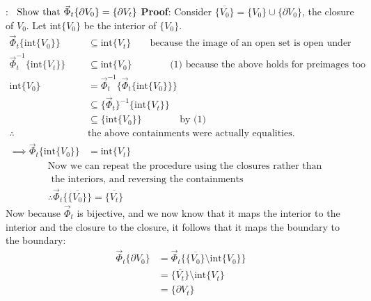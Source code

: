 \documentclass[a4paper,12pt]{article}
\begin{document}
\textbf{\citep[Problem 2.2.2.]{o81}}:$\;\;\; \text{Show that }\vec{\Phi}_t\{\partial V_0\} = \{\partial V_t\}\\ \\$
\textbf{Proof}: Consider $\overline{\{V_0\}} = \{V_0\} \cup \{\partial V_0\}$, the closure of $V_0$. Let int$\{V_0\}$ be the interior of $\{V_0\}$.
\begin{align*}
\vec{\Phi}_t\{\text{int}\{V_0\}\}&\subseteq \text{int}\{V_t\}\;\;\;\;\;\;\;\text{because the image of an open set is open under homeomorphisms}\\
\vec{\Phi}_t^{-1}\{\text{int}\{V_t\}\}&\subseteq \text{int}\{V_0\} \;\;\;\;\;\;\;\;\;\;\;\;\;\;\text{(1) because the above holds for preimages too}\\
\text{int}\{V_0\} &= \vec{\Phi}_t^{-1}\{\vec{\Phi}_t\{\text{int}\{V_0\}\}\}\\
&\subseteq \{\vec{\Phi}_t\}^{-1}\{\text{int}\{V_t\}\} \\
&\subseteq \{\text{int}\{V_0\}\}\;\;\;\;\;\;\;\;\;\;\;\;\;\; \text{by (1) }\\
\therefore &\text{the above containments were actually equalities.}\\
\implies \vec{\Phi}_t\{\text{int}\{V_0\}\} &= \text{int}\{V_t\}
\end{align*}
\begin{align*}
&\text{Now we can repeat the procedure using the closures rather than}\\
&\text{ the interiors, and reversing the containments}\\
&\therefore \vec{\Phi}_t\{\overline{\{V_0\}}\} = \overline{\{V_t\}}
\end{align*} Now because $\vec{\Phi}_t$ is bijective, and we now know that it maps the interior to the interior and the closure to the closure, it follows that it maps the boundary to the boundary:
\begin{align*}
\vec{\Phi}_t\{\partial V_0\} &= \vec{\Phi}_t \{\overline{\{V_0\}}\setminus \text{int}\{V_0\}\}\\
&= \overline{\{V_t\}}\setminus\text{int}\{V_t\}\\
&= \{\partial V_t\}
\end{align*}

\newpage


\end{document}
